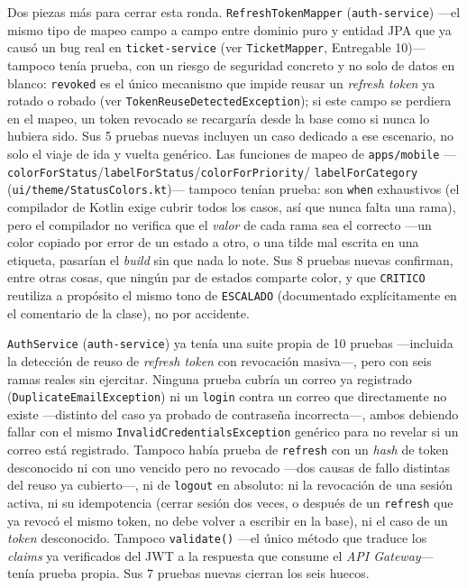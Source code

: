 Dos piezas más para cerrar esta ronda. \texttt{RefreshTokenMapper} (\texttt{auth-service}) —el
mismo tipo de mapeo campo a campo entre dominio puro y entidad JPA que ya causó un bug real en
\texttt{ticket-service} (ver \texttt{TicketMapper}, Entregable 10)— tampoco tenía prueba, con un
riesgo de seguridad concreto y no solo de datos en blanco: \texttt{revoked} es el único mecanismo
que impide reusar un \emph{refresh token} ya rotado o robado (ver
\texttt{TokenReuseDetectedException}); si este campo se perdiera en el mapeo, un token revocado
se recargaría desde la base como si nunca lo hubiera sido. Sus 5 pruebas nuevas incluyen un caso
dedicado a ese escenario, no solo el viaje de ida y vuelta genérico. Las funciones de mapeo de
\texttt{apps/mobile} —\texttt{colorForStatus}/\texttt{labelForStatus}/\texttt{colorForPriority}/
\texttt{labelForCategory} (\texttt{ui/theme/StatusColors.kt})— tampoco tenían prueba: son
\texttt{when} exhaustivos (el compilador de Kotlin exige cubrir todos los casos, así que nunca
falta una rama), pero el compilador no verifica que el \emph{valor} de cada rama sea el correcto
—un color copiado por error de un estado a otro, o una tilde mal escrita en una etiqueta, pasarían
el \emph{build} sin que nada lo note. Sus 8 pruebas nuevas confirman, entre otras cosas, que
ningún par de estados comparte color, y que \texttt{CRITICO} reutiliza a propósito el mismo tono
de \texttt{ESCALADO} (documentado explícitamente en el comentario de la clase), no por accidente.

\texttt{AuthService} (\texttt{auth-service}) ya tenía una suite propia de 10 pruebas —incluida la
detección de reuso de \emph{refresh token} con revocación masiva—, pero con seis ramas reales sin
ejercitar. Ninguna prueba cubría un correo ya registrado (\texttt{DuplicateEmailException}) ni un
\texttt{login} contra un correo que directamente no existe —distinto del caso ya probado de
contraseña incorrecta—, ambos debiendo fallar con el mismo \texttt{InvalidCredentialsException}
genérico para no revelar si un correo está registrado. Tampoco había prueba de \texttt{refresh}
con un \emph{hash} de token desconocido ni con uno vencido pero no revocado —dos causas de fallo
distintas del reuso ya cubierto—, ni de \texttt{logout} en absoluto: ni la revocación de una
sesión activa, ni su idempotencia (cerrar sesión dos veces, o después de un \texttt{refresh} que
ya revocó el mismo token, no debe volver a escribir en la base), ni el caso de un \emph{token}
desconocido. Tampoco \texttt{validate()} —el único método que traduce los \emph{claims} ya
verificados del JWT a la respuesta que consume el \emph{API Gateway}— tenía prueba propia. Sus 7
pruebas nuevas cierran los seis huecos.

